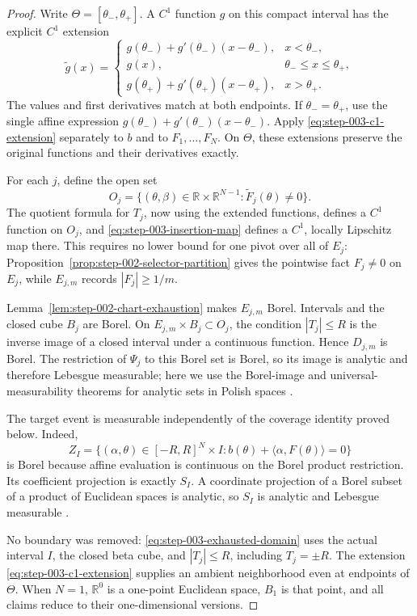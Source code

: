 \begin{proof}
Write $\Theta=[\theta_-,\theta_+]$.  A $C^1$ function $g$ on this compact
interval has the explicit $C^1$ extension
\begin{equation}
\widetilde g(x)=
\begin{cases}
g(\theta_-)+g'(\theta_-)(x-\theta_-),&x<\theta_-,\\
g(x),&\theta_-\leq x\leq\theta_+,\\
g(\theta_+)+g'(\theta_+)(x-\theta_+),&x>\theta_+.
\end{cases}
\label{eq:step-003-c1-extension}
\end{equation}
The values and first derivatives match at both endpoints.  If
$\theta_-=\theta_+$, use the single affine expression
$g(\theta_-)+g'(\theta_-)(x-\theta_-)$.  Apply
\eqref{eq:step-003-c1-extension} separately to $b$ and to
$F_1,\ldots,F_N$.  On $\Theta$, these extensions preserve the original
functions and their derivatives exactly.

For each $j$, define the open set
\[
O_j=\{(\theta,\beta)\in\mathbb R\times\mathbb R^{N-1}:
\widetilde F_j(\theta)\neq0\}.
\]
The quotient formula for $T_j$, now using the extended functions, defines a
$C^1$ function on $O_j$, and
\eqref{eq:step-003-insertion-map} defines a $C^1$, locally Lipschitz map
there.  This requires no lower bound for one pivot over all of $E_j$:
Proposition~\ref{prop:step-002-selector-partition} gives the pointwise fact
$F_j\neq0$ on $E_j$, while $E_{j,m}$ records $|F_j|\geq1/m$.

Lemma~\ref{lem:step-002-chart-exhaustion} makes $E_{j,m}$ Borel.
Intervals and the closed cube $B_j$ are Borel.  On
$E_{j,m}\times B_j\subset O_j$, the condition $|T_j|\leq R$ is the inverse
image of a closed interval under a continuous function.  Hence
$D_{j,m}$ is Borel.  The restriction of $\Psi_j$ to this Borel set is
Borel, so its image is analytic and therefore Lebesgue measurable; here we
use the Borel-image and universal-measurability theorems for analytic sets
in Polish spaces \citep{kechris1995}.

The target event is measurable independently of the coverage identity proved
below.  Indeed,
\[
Z_I=\{(\alpha,\theta)\in[-R,R]^N\times I:
b(\theta)+\langle\alpha,F(\theta)\rangle=0\}
\]
is Borel because affine evaluation is continuous on the Borel product
restriction.  Its coefficient projection is exactly $S_I$.  A coordinate
projection of a Borel subset of a product of Euclidean spaces is analytic,
so $S_I$ is analytic and Lebesgue measurable \citep{kechris1995}.

No boundary was removed: \eqref{eq:step-003-exhausted-domain} uses the actual
interval $I$, the closed beta cube, and $|T_j|\leq R$, including
$T_j=\pm R$.  The extension \eqref{eq:step-003-c1-extension} supplies an
ambient neighborhood even at endpoints of $\Theta$.  When $N=1$,
$\mathbb R^0$ is a one-point Euclidean space, $B_1$ is that point, and all
claims reduce to their one-dimensional versions.
\end{proof}

